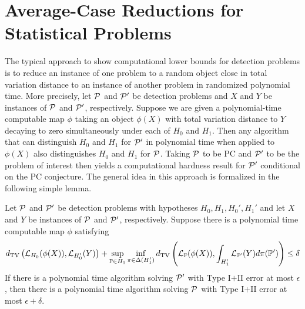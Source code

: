 \documentclass[11pt]{article}
\begin{document}
\section{Average-Case Reductions for Statistical Problems}


The typical approach to show computational lower bounds for detection problems is to reduce an instance of one problem to a random object close in total variation distance to an instance of another problem in randomized polynomial time. More precisely, let $\mathcal{P}$ and $\mathcal{P}'$ be detection problems and $X$ and $Y$ be instances of $\mathcal{P}$ and $\mathcal{P}'$, respectively. Suppose we are given a polynomial-time computable map $\phi$ taking an object $\phi(X)$ with total variation distance to $Y$ decaying to zero simultaneously under each of $H_0$ and $H_1$. Then any algorithm that can distinguish $H_0$ and $H_1$ for $\mathcal{P}'$ in polynomial time when applied to $\phi(X)$ also distinguishes $H_0$ and $H_1$ for $\mathcal{P}$. Taking $\mathcal{P}$ to be PC and $\mathcal{P}'$ to be the problem of interest then yields a computational hardness result for $\mathcal{P}'$ conditional on the PC conjecture. The general idea in this approach is formalized in the following simple lemma.

\begin{lemma}
Let $\mathcal{P}$ and $\mathcal{P}'$ be detection problems with hypotheses $H_0, H_1, H_0', H_1'$ and let $X$ and $Y$ be instances of $\mathcal{P}$ and $\mathcal{P}'$, respectively. Suppose there is a polynomial time computable map $\phi$ satisfying
$$d_{\text{TV}}\left(\mathcal{L}_{H_0}(\phi(X)), \mathcal{L}_{H_0'}(Y)\right) + \sup_{\mathbb{P} \in H_1} \inf_{\pi \in \Delta(H_1')} d_{\text{TV}}\left( \mathcal{L}_{\mathbb{P}}(\phi(X)), \int_{H_1'} \mathcal{L}_{\mathbb{P}'}(Y) d\pi(\mathbb{P}') \right) \le \delta$$
If there is a polynomial time algorithm solving $\mathcal{P}'$ with Type I$+$II error at most $\epsilon$, then there is a polynomial time algorithm solving $\mathcal{P}$ with Type I$+$II error at most $\epsilon + \delta$.
\end{lemma}
\end{document}
